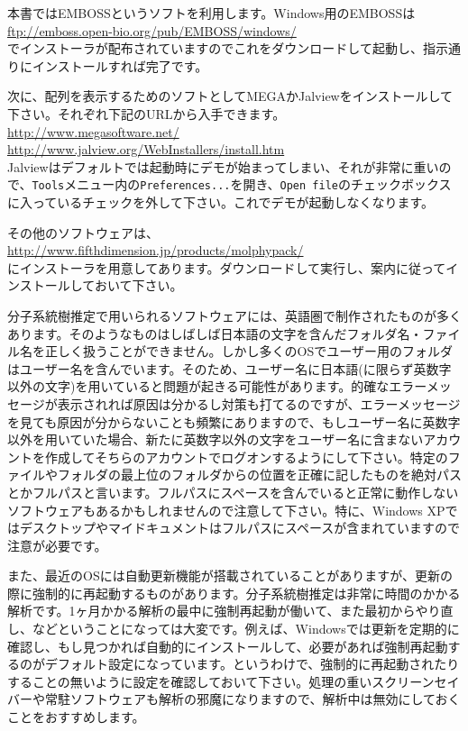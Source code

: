 \documentclass[titlepage,10pt,a4paper]{jsbook}
\begin{document}
本書ではEMBOSSというソフトを利用します。Windows用のEMBOSSは\\
\href{ftp://emboss.open-bio.org/pub/EMBOSS/windows/}{ftp://emboss.open-bio.org/pub/EMBOSS/windows/}\\
でインストーラが配布されていますのでこれをダウンロードして起動し、指示通りにインストールすれば完了です。

次に、配列を表示するためのソフトとしてMEGAかJalviewをインストールして下さい。それぞれ下記のURLから入手できます。\\
\href{http://www.megasoftware.net/}{http://www.megasoftware.net/}\\
\href{http://www.jalview.org/Web_Installers/install.htm}{http://www.jalview.org/Web{\textunderscore}Installers/install.htm}\\
Jalviewはデフォルトでは起動時にデモが始まってしまい、それが非常に重いので、\texttt{Tools}メニュー内の\texttt{Preferences...}を開き、\texttt{Open file}のチェックボックスに入っているチェックを外して下さい。これでデモが起動しなくなります。

その他のソフトウェアは、\\
\href{http://www.fifthdimension.jp/products/molphypack/}{http://www.fifthdimension.jp/products/molphypack/}\\
にインストーラを用意してあります。ダウンロードして実行し、案内に従ってインストールしておいて下さい。

分子系統樹推定で用いられるソフトウェアには、英語圏で制作されたものが多くあります。そのようなものはしばしば日本語の文字を含んだフォルダ名・ファイル名を正しく扱うことができません。しかし多くのOSでユーザー用のフォルダはユーザー名を含んでいます。そのため、ユーザー名に日本語(に限らず英数字以外の文字)を用いていると問題が起きる可能性があります。的確なエラーメッセージが表示されれば原因は分かるし対策も打てるのですが、エラーメッセージを見ても原因が分からないことも頻繁にありますので、もしユーザー名に英数字以外を用いていた場合、新たに英数字以外の文字をユーザー名に含まないアカウントを作成してそちらのアカウントでログオンするようにして下さい。特定のファイルやフォルダの最上位のフォルダからの位置を正確に記したものを絶対パスとかフルパスと言います。フルパスにスペースを含んでいると正常に動作しないソフトウェアもあるかもしれませんので注意して下さい。特に、Windows XPではデスクトップやマイドキュメントはフルパスにスペースが含まれていますので注意が必要です。

また、最近のOSには自動更新機能が搭載されていることがありますが、更新の際に強制的に再起動するものがあります。分子系統樹推定は非常に時間のかかる解析です。1ヶ月かかる解析の最中に強制再起動が働いて、また最初からやり直し、などということになっては大変です。例えば、Windowsでは更新を定期的に確認し、もし見つかれば自動的にインストールして、必要があれば強制再起動するのがデフォルト設定になっています。というわけで、強制的に再起動されたりすることの無いように設定を確認しておいて下さい。処理の重いスクリーンセイバーや常駐ソフトウェアも解析の邪魔になりますので、解析中は無効にしておくことをおすすめします。
\end{document}
